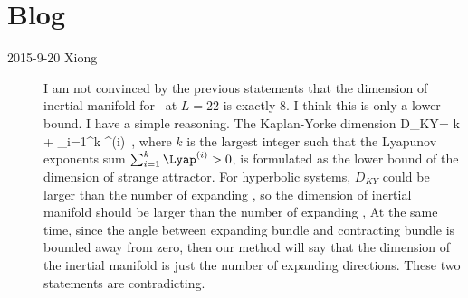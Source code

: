 \section{Blog}
\label{sec:blog}

\begin{description}

\item[2015-9-20 Xiong] I am not convinced by the previous
statements that the dimension of inertial manifold for
\KSe\ at $L=22$ is exactly 8. I think this is only a lower bound.
I have a simple reasoning. The Kaplan-Yorke dimension
\beq
    D_{KY}= k +  \sum_{i=1}^k \Lyap^{(i)}
\,,
where $k$ is the largest integer such that the Lyapunov exponents sum
$\sum_{i=1}^k \Lyap^{(i)}>0$,
is formulated as the lower bound of the dimension of strange attractor. 
For hyperbolic systems,  $D_{KY}$  could be larger than the number of
expanding \cLvs, so the dimension 
of inertial manifold should be larger than the number of 
expanding \cLvs, At the same time, since the angle 
between expanding bundle and contracting bundle is bounded away from
zero, then our method will say that the dimension of the inertial 
manifold is just the number of expanding directions. These two 
statements are contradicting. 


\end{description}